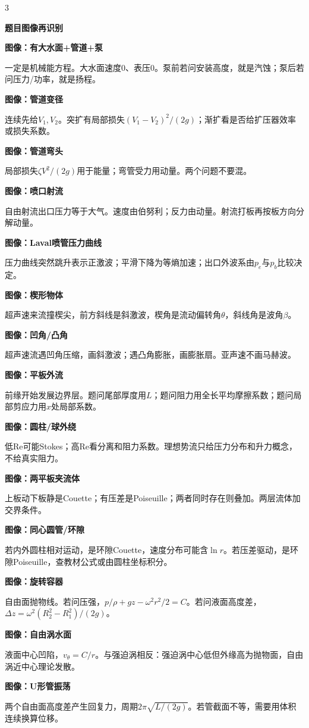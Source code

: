 \documentclass[a4paper]{article}
\newcommand{\qt}[1]{\vspace{0.25pt}\colorbox{Q}{\parbox{\dimexpr\linewidth-2\fboxsep}{\color{white}\bfseries #1}}\par}
\newcommand{\sect}[1]{\qt{#1}}
\newcommand{\miniimg}[2]{}
\begin{document}
\begin{multicols}{3}
{\sect{题目图像再识别}
\miniimg{0.98}{assets/original_problem_schematics_generic.png}
\sect{图像：有大水面+管道+泵}
一定是机械能方程。大水面速度0、表压0。泵前若问安装高度，就是汽蚀；泵后若问压力/功率，就是扬程。
\sect{图像：管道变径}
连续先给$V_1,V_2$。突扩有局部损失$(V_1-V_2)^2/(2g)$；渐扩看是否给扩压器效率或损失系数。
\sect{图像：管道弯头}
局部损失$\zeta V^2/(2g)$用于能量；弯管受力用动量。两个问题不要混。
\sect{图像：喷口射流}
自由射流出口压力等于大气。速度由伯努利；反力由动量。射流打板再按板方向分解动量。
\sect{图像：Laval喷管压力曲线}
压力曲线突然跳升表示正激波；平滑下降为等熵加速；出口外波系由$p_e$与$p_b$比较决定。
\sect{图像：楔形物体}
超声速来流撞楔尖，前方斜线是斜激波，楔角是流动偏转角$\theta$，斜线角是波角$\beta$。
\sect{图像：凹角/凸角}
超声速流遇凹角压缩，画斜激波；遇凸角膨胀，画膨胀扇。亚声速不画马赫波。
\sect{图像：平板外流}
前缘开始发展边界层。题问尾部厚度用$L$；题问阻力用全长平均摩擦系数；题问局部剪应力用$x$处局部系数。
\sect{图像：圆柱/球外绕}
低Re可能Stokes；高Re看分离和阻力系数。理想势流只给压力分布和升力概念，不给真实阻力。
\sect{图像：两平板夹流体}
上板动下板静是Couette；有压差是Poiseuille；两者同时存在则叠加。两层流体加交界条件。
\sect{图像：同心圆管/环隙}
若内外圆柱相对运动，是环隙Couette，速度分布可能含$\ln r$。若压差驱动，是环隙Poiseuille，查教材公式或由圆柱坐标积分。
\sect{图像：旋转容器}
自由面抛物线。若问压强，$p/\rho+gz-\omega^2r^2/2=C$。若问液面高度差，$\Delta z=\omega^2(R_2^2-R_1^2)/(2g)$。
\sect{图像：自由涡水面}
液面中心凹陷，$v_\theta=C/r$。与强迫涡相反：强迫涡中心低但外缘高为抛物面，自由涡近中心理论发散。
\sect{图像：U形管振荡}
两个自由面高度差产生回复力，周期$2\pi\sqrt{L/(2g)}$。若管截面不等，需要用体积连续换算位移。

}
\end{multicols}
\end{document}
